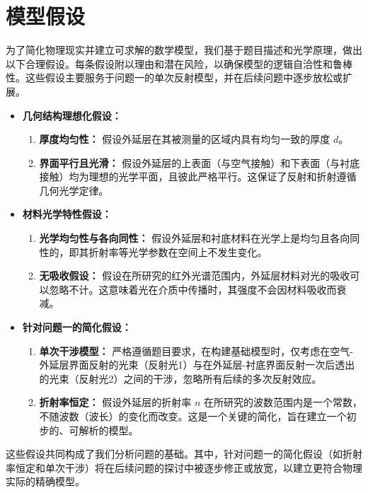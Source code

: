 \documentclass[withoutpreface,bwprint]{cumcmthesis} %
\begin{document}
\section{模型假设}

为了简化物理现实并建立可求解的数学模型，我们基于题目描述和光学原理，做出以下合理假设。每条假设附以理由和潜在风险，以确保模型的逻辑自洽性和鲁棒性。这些假设主要服务于问题一的单次反射模型，并在后续问题中逐步放松或扩展。

\begin{itemize}
    \item \textbf{几何结构理想化假设：}
          \begin{enumerate}
              \item \textbf{厚度均匀性：} 假设外延层在其被测量的区域内具有均匀一致的厚度 $d$。
              \item \textbf{界面平行且光滑：} 假设外延层的上表面（与空气接触）和下表面（与衬底接触）均为理想的光学平面，且彼此严格平行。这保证了反射和折射遵循几何光学定律。
          \end{enumerate}
    \item \textbf{材料光学特性假设：}
          \begin{enumerate}
              \item \textbf{光学均匀性与各向同性：} 假设外延层和衬底材料在光学上是均匀且各向同性的，即其折射率等光学参数在空间上不发生变化。
              \item \textbf{无吸收假设：} 假设在所研究的红外光谱范围内，外延层材料对光的吸收可以忽略不计。这意味着光在介质中传播时，其强度不会因材料吸收而衰减。
          \end{enumerate}
    \item \textbf{针对问题一的简化假设：}
          \begin{enumerate}
              \item \textbf{单次干涉模型：} 严格遵循题目要求，在构建基础模型时，仅考虑在空气-外延层界面反射的光束（反射光1）与在外延层-衬底界面反射一次后透出的光束（反射光2）之间的干涉，忽略所有后续的多次反射效应。
              \item \textbf{折射率恒定：} 假设外延层的折射率 $n$ 在所研究的波数范围内是一个常数，不随波数（波长）的变化而改变。这是一个关键的简化，旨在建立一个初步的、可解析的模型。
          \end{enumerate}


\end{itemize}
这些假设共同构成了我们分析问题的基础。其中，针对问题一的简化假设（如折射率恒定和单次干涉）将在后续问题的探讨中被逐步修正或放宽，以建立更符合物理实际的精确模型。
\end{document}
